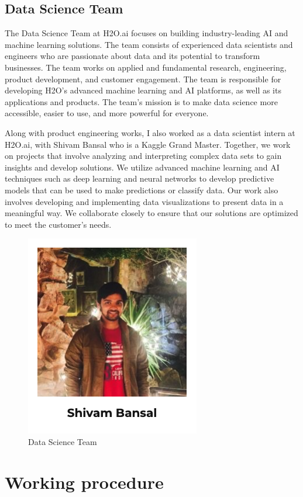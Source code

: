 \documentclass[12pt,a4paper]{report}
\begin{document}
\subsection {Data Science Team}

The Data Science Team at H2O.ai focuses on building industry-leading \ac{AI} and machine learning solutions. The team consists of experienced data scientists and engineers who are passionate about data and its potential to transform businesses. The team works on applied and fundamental research, engineering, product development, and customer engagement. The team is responsible for developing H2O's advanced machine learning and \ac{AI} platforms, as well as its applications and products. The team's mission is to make data science more accessible, easier to use, and more powerful for everyone.

Along with product engineering works, I also worked as a data scientist intern at H2O.ai, with Shivam Bansal who is a Kaggle Grand Master. Together, we work on projects that involve analyzing and interpreting complex data sets to gain insights and develop solutions. We utilize advanced machine learning and \ac{AI} techniques such as deep learning and neural networks to develop predictive models that can be used to make predictions or classify data. Our work also involves developing and implementing data visualizations to present data in a meaningful way. We collaborate closely to ensure that our solutions are optimized to meet the customer's needs.

\begin{figure}[H]
\centering
\includegraphics[width=0.5\linewidth]{shivam.png}
\caption{Data Science Team}
\end{figure}

\section{Working procedure}
\end{document}
